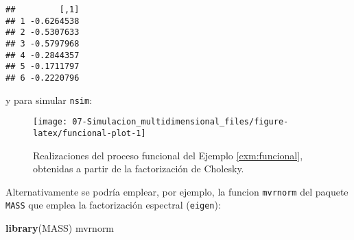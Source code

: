 \documentclass[
]{book}
\newenvironment{Shaded}{\begin{snugshade}}{\end{snugshade}}
\newcommand{\DataTypeTok}[1]{\textcolor[rgb]{0.13,0.29,0.53}{#1}}
\newcommand{\DecValTok}[1]{\textcolor[rgb]{0.00,0.00,0.81}{#1}}
\newcommand{\FloatTok}[1]{\textcolor[rgb]{0.00,0.00,0.81}{#1}}
\newcommand{\KeywordTok}[1]{\textcolor[rgb]{0.13,0.29,0.53}{\textbf{#1}}}
\newcommand{\NormalTok}[1]{#1}
\newcommand{\OperatorTok}[1]{\textcolor[rgb]{0.81,0.36,0.00}{\textbf{#1}}}
\newcommand{\StringTok}[1]{\textcolor[rgb]{0.31,0.60,0.02}{#1}}
\theoremstyle{break}
\theoremstyle{definition}
\theoremstyle{definition}
\theoremstyle{definition}
\theoremstyle{remark}
\begin{document}
\begin{Shaded}
\end{Shaded}

\begin{verbatim}
##         [,1]
## 1 -0.6264538
## 2 -0.5307633
## 3 -0.5797968
## 4 -0.2844357
## 5 -0.1711797
## 6 -0.2220796
\end{verbatim}

y para simular \texttt{nsim}:



\begin{Shaded}
\end{Shaded}

\begin{figure}[!htb]

{\centering \texttt{[image: 07-Simulacion\_multidimensional\_files/figure-latex/funcional-plot-1]} 

}

\caption{Realizaciones del proceso funcional del Ejemplo \ref{exm:funcional}, obtenidas a partir de la factorización de Cholesky.}\label{fig:funcional-plot}
\end{figure}

Alternativamente se podría emplear, por ejemplo, la funcion \texttt{mvrnorm}
del paquete \texttt{MASS} que emplea la factorización espectral (\texttt{eigen}):



\begin{Shaded}
\begin{Highlighting}[]
\KeywordTok{library}\NormalTok{(MASS)}
\NormalTok{mvrnorm}
\end{Highlighting}
\end{Shaded}
\end{document}
